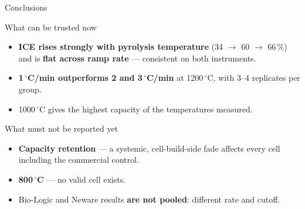 \begin{frame}{Conclusions}
  \begin{block}{What can be trusted now}
    \small
    \begin{itemize}
      \item \textbf{ICE rises strongly with pyrolysis temperature}
            (34 \(\rightarrow\) 60 \(\rightarrow\) 66\,\%) and is
            \textbf{flat across ramp rate} --- consistent on both instruments.
      \item \textbf{1\,\({^\circ}\)C/min outperforms 2 and 3\,\({^\circ}\)C/min}
            at 1200\,\({^\circ}\)C, with 3--4 replicates per group.
      \item 1000\,\({^\circ}\)C gives the highest capacity of the temperatures measured.
    \end{itemize}
  \end{block}
  \begin{block}{What must not be reported yet}
    \small
    \begin{itemize}
      \item \textbf{Capacity retention} --- a systemic, cell-build-side fade affects
            every cell including the commercial control.
      \item \textbf{800\,\({^\circ}\)C} --- no valid cell exists.
      \item Bio-Logic and Neware results \textbf{are not pooled}: different rate and cutoff.
    \end{itemize}
  \end{block}
\end{frame}

